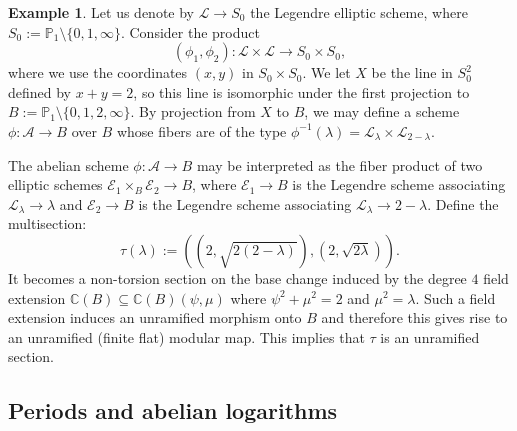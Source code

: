 \documentclass[10 pt,a4paper]{article}
\theoremstyle{plain}
\theoremstyle{definition}
\newtheorem{expl}[thm]{Example}
\theoremstyle{named}
\newcommand{\cA}{\mathcal A}
\newcommand{\bC}{\mathbb C}
\newcommand{\cE}{\mathcal E}
\begin{document}
\begin{expl}\label{expl:tor_ram}
    Let us denote by $\mathcal L \to S_0$ the Legendre elliptic scheme, where $S_0:=\mathbb P_1 \setminus \{0,1,\infty\}$. Consider the product
    \[
    (\phi_1,\phi_2):\mathcal L \times \mathcal L \to S_0\times S_0,
    \]
    where we use the coordinates $(x,y)$ in $S_0\times S_0$. We let $X$ be the line in $S_0^2$ defined by $x+y= 2$, so this line is isomorphic under the first projection to $B:=\mathbb P_1 \setminus \{0,1,2,\infty\}$. By projection from $X$ to $B$, we may define a scheme $\phi: \cA \to B$ over $B$ whose fibers are of the type $\phi^{-1}(\lambda) = \mathcal L_\lambda \times \mathcal L_{2-\lambda}$.


    The abelian scheme $\phi:\cA \to B$ may be interpreted as the fiber product of two elliptic schemes $\cE_1 \times_B \cE_2 \to B$, where $\cE_1 \to B$ is the Legendre scheme associating $\mathcal L_\lambda \to \lambda$ and $\cE_2 \to B$ is the Legendre scheme associating $\mathcal L_\lambda \to 2-\lambda$. Define the multisection:
    \[
    \tau(\lambda):=\left(\left(2,\sqrt{2(2-\lambda)}\right), \left(2, \sqrt{2\lambda}\right)\right).
    \]
    It becomes a non-torsion section on the base change induced by the degree $4$ field extension $\bC(B) \subseteq \bC(B)(\psi,\mu)$ where $\psi^2+\mu^2=2$ and $\mu^2=\lambda$. Such a field extension induces an unramified morphism onto $B$ and therefore this gives rise to an unramified (finite flat) modular map. This implies that $\tau$ is an unramified section.
\end{expl}





\subsection{Periods and abelian logarithms}\label{perAbLog}
\end{document}
